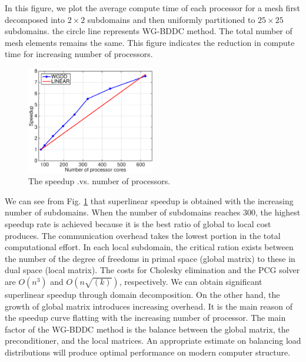									In this figure, we plot the average compute time of each processor for a mesh first decomposed into $ 2 \times 2 $ subdomains and then uniformly partitioned to $ 25 \times 25 $ subdomains.  the circle line represents WG-BDDC method. The total number of mesh elements remains the same. This figure indicates the reduction in compute time for increasing number of processors. 
									
									\begin{figure}[H]
										\centering
										\includegraphics[width=0.5\textwidth]{./pics/p1speed.eps}
										\caption{\footnotesize The speedup .vs. number of processors.}\label{fig10: speed}
									\end{figure}
									
									
									We can see from Fig. \ref{fig10: speed} that superlinear speedup is obtained with the increasing number of subdomains. When the number of subdomains reaches $ 300 $, the highest speedup rate is achieved because it is the best ratio of global to local cost produces. The communication overhead takes the lowest portion in the total computational effort. In each local subdomain, the critical ration exists between the number of the degree of freedoms in primal space (global matrix) to these in dual space (local matrix). The costs for Cholesky elimination and the PCG  solver are $ O(n^{3}) $ and $ O(n\sqrt{(k)}) $, respectively. We can obtain significant superlinear speedup through domain decomposition. On the other hand, the growth of global matrix introduces increasing overhead. It is the main reason of the speedup curve flatting with the increasing number of processor. The main factor of the WG-BDDC method is the balance between the global matrix, the preconditioner, and the local matrices. An appropriate estimate on balancing load distributions will produce optimal performance on modern computer structure.
									
